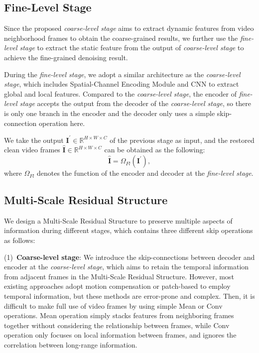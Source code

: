 \documentclass[journal]{IEEEtran}
\begin{document}
\subsection{Fine-Level Stage}

Since the proposed \emph{coarse-level stage} aims to extract dynamic features from video neighborhood frames to obtain the coarse-grained results, we further use the \emph{fine-level stage} to extract the static feature from the output of \emph{coarse-level stage} to achieve the fine-grained denoising result.

During the \emph{fine-level stage}, we adopt a similar architecture as the \emph{coarse-level stage}, which includes Spatial-Channel Encoding Module and CNN to extract global and local features. Compared to the \emph{coarse-level stage}, the encoder of \emph{fine-level stage} accepts the output from the decoder of the \emph{coarse-level stage}, so there is only one branch in the encoder and the decoder only uses a simple skip-connection operation here. 

We take the output $\mathbf{I}^{\prime} \in \mathbb{R}^{H \times W \times C}$ of the previous stage as input, and the restored clean video frames $\hat{\mathbf{I}} \in \mathbb{R}^{H \times W \times C}$ can be obtained as the following: 
\begin{equation}
\hat{\mathbf{I}}=\Omega_{Fl}\left(\mathbf{I}^{\prime}\right),
\end{equation}
where $\Omega_{Fl}$ denotes the function of the encoder and decoder at the \emph{fine-level stage}.

\subsection{Multi-Scale Residual Structure}
We design a Multi-Scale Residual Structure to preserve multiple aspects of information during different stages, which contains three different skip operations as follows: 

\noindent(1)~\textbf{Coarse-level stage}: We introduce the skip-connections between decoder and encoder at the \emph{coarse-level stage}, which aims to retain the temporal information from adjacent frames in the Multi-Scale Residual Structure. However, most existing approaches adopt motion compensation or patch-based to employ temporal information, but these methods are error-prone and complex. Then, it is difficult to make full use of video frames by using simple Mean or Conv operations. Mean operation simply stacks features from neighboring frames together without considering the relationship between frames, while Conv operation only focuses on local information between frames, and ignores the correlation between long-range information. 
\end{document}
